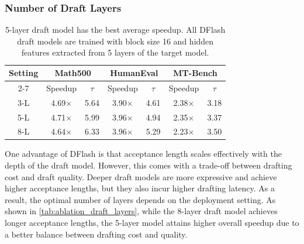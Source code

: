 \subsubsection{Number of Draft Layers}
\label{sec:ablation_layers}
\begin{table}[h]
\centering
\renewcommand{\arraystretch}{0.9}
\caption{5-layer draft model has the best average speedup. All DFlash draft models are trained with block size 16 and hidden features extracted from 5 layers of the target model.}
\label{tab:ablation_draft_layers}
\small
\setlength{\tabcolsep}{3pt}
\begin{tabular}{c cc cc cc}
\toprule
\multirow{2}[2]{*}{Setting}
& \multicolumn{2}{c}{Math500} 
& \multicolumn{2}{c}{HumanEval} 
& \multicolumn{2}{c}{MT-Bench} \\
\cmidrule{2-7}
& Speedup & $\tau$
& Speedup & $\tau$
& Speedup & $\tau$ \\
\midrule
3-L & 4.69$\times$ & 5.64 & 3.90$\times$ & 4.61 & 2.38$\times$ & 3.18 \\
5-L & 4.71$\times$ & 5.99 & 3.96$\times$ & 4.94 & 2.35$\times$ & 3.37 \\
8-L & 4.64$\times$ & 6.33 & 3.96$\times$ & 5.29 & 2.23$\times$ & 3.50 \\
\bottomrule
\end{tabular}
\end{table}
One advantage of DFlash is that acceptance length scales effectively with the depth of the draft model. However, this comes with a trade-off between drafting cost and draft quality. Deeper draft models are more expressive and achieve higher acceptance lengths, but they also incur higher drafting latency. As a result, the optimal number of layers depends on the deployment setting. As shown in \autoref{tab:ablation_draft_layers}, while the 8-layer draft model achieves longer acceptance lengths, the 5-layer model attains higher overall speedup due to a better balance between drafting cost and quality.

